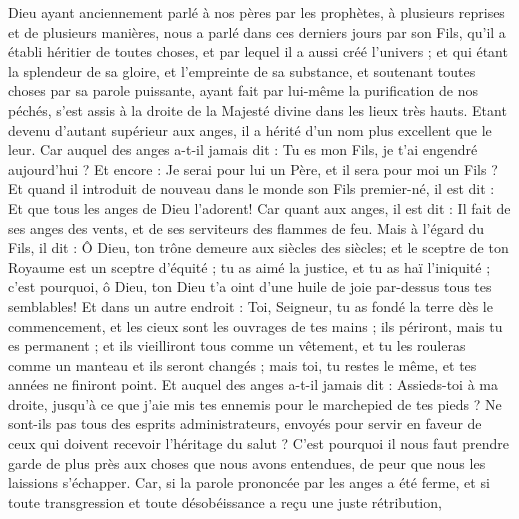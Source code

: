 \begin{multicols}{2}
\VerseOne{}Dieu ayant anciennement parlé à nos pères par les prophètes, à plusieurs reprises et de plusieurs manières,
nous a parlé dans ces derniers jours par son Fils, qu'il a établi héritier de toutes choses, et par lequel il a aussi créé l'univers ;
et qui étant la splendeur de sa gloire, et l'empreinte de sa substance, et soutenant toutes choses par sa parole puissante, ayant fait par lui-même la purification de nos péchés, s'est assis à la droite de la Majesté divine dans les lieux très hauts.
Etant devenu d'autant supérieur aux anges, il a hérité d'un nom plus excellent que le leur.
Car auquel des anges a-t-il jamais dit : Tu es mon Fils, je t'ai engendré aujourd'hui ? Et encore : Je serai pour lui un Père, et il sera pour moi un Fils ?
Et quand il introduit de nouveau dans le monde son Fils premier-né, il est dit : Et que tous les anges de Dieu l'adorent!
Car quant aux anges, il est dit : Il fait de ses anges des vents, et de ses serviteurs des flammes de feu.
Mais à l'égard du Fils, il dit : Ô Dieu, ton trône demeure aux siècles des siècles; et le sceptre de ton Royaume est un sceptre d'équité ;
tu as aimé la justice, et tu as haï l'iniquité ; c'est pourquoi, ô Dieu, ton Dieu t'a oint d'une huile de joie par-dessus tous tes semblables!
Et dans un autre endroit : Toi, Seigneur, tu as fondé la terre dès le commencement, et les cieux sont les ouvrages de tes mains ;
ils périront, mais tu es permanent ; et ils vieilliront tous comme un vêtement,
et tu les rouleras comme un manteau et ils seront changés ; mais toi, tu restes le même, et tes années ne finiront point.
Et auquel des anges a-t-il jamais dit : Assieds-toi à ma droite, jusqu'à ce que j'aie mis tes ennemis pour le marchepied de tes pieds ?
Ne sont-ils pas tous des esprits administrateurs, envoyés pour servir en faveur de ceux qui doivent recevoir l'héritage du salut ?
\VerseOne{}C'est pourquoi il nous faut prendre garde de plus près aux choses que nous avons entendues, de peur que nous les laissions s'échapper.
Car, si la parole prononcée par les anges a été ferme, et si toute transgression et toute désobéissance a reçu une juste rétribution,

\end{multicols}
